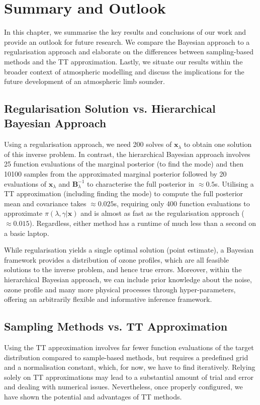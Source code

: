 \chapter{Summary and Outlook}
\label{ch:Concl}
\thispagestyle{empty}
In this chapter, we summarise the key results and conclusions of our work and provide an outlook for future research.
We compare the Bayesian approach to a regularisation approach and elaborate on the differences between sampling-based methods and the TT approximation.
Lastly, we situate our results within the broader context of atmospheric modelling and discuss the implications for the future development of an atmospheric limb sounder.



\section{Regularisation Solution vs. Hierarchical Bayesian Approach}
Using a regularisation approach, we need 200 solves of $\bm{x}_{\lambda}$ to obtain one solution of this inverse problem.
In contrast, the hierarchical Bayesian approach involves 25 function evaluations of the marginal posterior (to find the mode) and then 10100 samples from the approximated marginal posterior followed by 20 evaluations of $\bm{x}_{\lambda}$ and $\bm{B}^{-1}_{\lambda}$ to characterise the full posterior in $\approx 0.5$s.
Utilising a TT approximation (including finding the mode) to compute the full posterior mean and covariance takes $\approx 0.025$s, requiring only 400 function evaluations to approximate $\pi(\lambda, \gamma | \bm{x})$ and is almost as fast as the regularisation approach ($\approx 0.015$).
Regardless, either method has a runtime of much less than a second on a basic laptop.

While regularisation yields a single optimal solution (point estimate), a Bayesian framework provides a distribution of ozone profiles, which are all feasible solutions to the inverse problem, and hence true errors.
Moreover, within the hierarchical Bayesian approach, we can include prior knowledge about the noise, ozone profile and many more physical processes through hyper-parameters, offering an arbitrarily flexible and informative inference framework.


\section{Sampling Methods vs. TT Approximation}
Using the TT approximation involves far fewer function evaluations of the target distribution compared to sample-based methods, but requires a predefined grid and a normalisation constant, which, for now, we have to find iteratively.
Relying solely on TT approximations may lead to a substantial amount of trial and error and dealing with numerical issues.
Nevertheless, once properly configured, we have shown the potential and advantages of TT methods.

